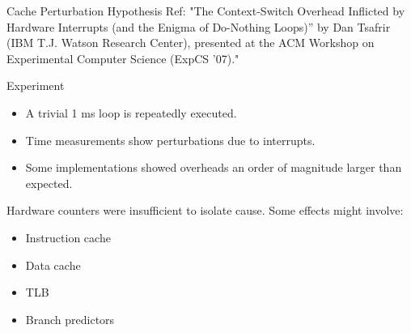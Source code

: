 \begin{frame}{Cache Perturbation Hypothesis}
  Ref: "The Context-Switch Overhead Inflicted by
  Hardware Interrupts (and the Enigma of
  Do-Nothing Loops)” by Dan Tsafrir (IBM T.J. Watson
  Research Center), presented at the ACM
  Workshop on Experimental Computer Science (ExpCS ’07)."

  \begin{block}{Experiment}
    \begin{itemize}
      \item A trivial 1 ms loop is repeatedly executed.
      \item Time measurements show perturbations due to interrupts.
      \item Some implementations showed overheads an order of magnitude larger than expected.
    \end{itemize}
  \end{block}

  Hardware counters were insufficient to isolate cause.
  Some effects might involve:

  \begin{itemize}\tightlist
    \item Instruction cache
    \item Data cache
    \item TLB
    \item Branch predictors
  \end{itemize}
\end{frame}

